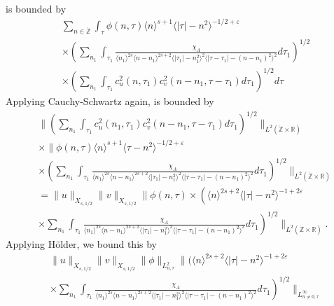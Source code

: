 \documentclass[12pt,reqno]{amsart}
\numberwithin{equation}{section}  %
\renewcommand{\cref}{\Cref}
\newcommand{\rr}{\mathbb{R}}
\newcommand{\zz}{\mathbb{Z}}
\newcommand{\zzdot}{\dot{\zz}}
\newcommand{\ee}{\varepsilon}
\begin{document}
is bounded by 
\begin{equation}
\label{10g}
\begin{split}
& \sum_{n \in \zzdot} \int_{\tau} \phi(n, \tau) \langle n \rangle ^{s+1}
\langle | \tau | - n^{2} \rangle ^{-1/2+\ee}
\\
& \times \left( \sum_{n_{1}} \int_{\tau_{1}}
\frac{\chi_{A}}{\langle n_{1} \rangle ^{2s} \langle n-n_{1} \rangle ^{2s+2} \langle |
\tau_{1} | - n_{1}^{2}\rangle^{2}  \langle | \tau - \tau_{1} | -
(n - n_{1})^{2} \rangle^{2}} d \tau_{1} \right)^{1/2}
\\
& \times \left( \sum_{n_{1}} \int_{\tau_{1}} c_{u}^{2}(n, \tau_{1})
c_{v}^{2}(n - n_{1}, \tau - \tau_{1}) d \tau_{1} \right)^{1/2} d \tau
\end{split}
\end{equation}
Applying Cauchy-Schwartz again, \cref{10g} is bounded by
\begin{equation*}
\begin{split}
& \|\left( \sum_{n_{1}}\int_{\tau_{1}} c_{u}^{2}(n_1, \tau_1)
c_{v}^{2} (n - n_1, \tau - \tau_{1} ) d \tau_1  \right)^{1/2} \|_{L^{2}(\zzdot \times
\rr)}
\\
& \times  \|\phi(n, \tau)  \langle n
\rangle ^{s+1} \langle \tau - n^{2} \rangle ^{-1/2+\ee}
\\
& \times \left( \sum_{n_{1}} \int_{\tau_{1}} \frac{\chi_{A}}{\langle n_{1}
\rangle ^{2s} \langle n-n_{1} \rangle ^{2s+2} \langle | \tau_{1}|-n_{1}^{2}
\rangle^{2} \langle  |\tau -
\tau_{1} | -(n - n_{1})^{2}
\rangle^{2}} d \tau_1 \right)^{1/2} \|_{L^2(\zzdot \times \rr)}
\\
& = \|u\|_{X_{s,1/2}} \|v\|_{X_{s,1/2}} \label{holder-term}
\|\phi(n, \tau) \times \left(  \langle n
\rangle ^{2s+2} \langle |\tau| - n^{2} \rangle^{-1 + 2\ee}  \right .
\\
& \times \left . \sum_{n_{1}} \int_{\tau_{1}} \frac{\chi_{A}}{\langle n_{1} \rangle ^{2s} \langle
n-n_{1} \rangle ^{2s+2}  \langle | \tau_{1}|-n_{1}^{2} \rangle^{2} \langle  |\tau -
\tau_{1} | -(n - n_{1})^{2}
\rangle^{2}} d \tau_1 \right)^{1/2} \|_{L^2(\zzdot \times \rr)}.
\end{split}
\end{equation*}
Applying H{\"o}lder, we bound this by 
\begin{equation}
\label{integral-bound-1st-form-per}
\begin{split}
& \|u\|_{X_{s,1/2}} \|v\|_{X_{s,1/2}} \| \phi \|_{L^{2}_{n, \tau}}
\|\bigg (  \langle n
\rangle ^{2s+2} \langle | \tau | - n^{2} \rangle ^{-1 + 2\ee}
\\
& \times \left. 
\sum_{n_{1}} \int_{\tau_{1}} \frac{\chi_{A}}{\langle n_{1} \rangle ^{2s} \langle
n-n_{1} \rangle ^{2s+2} \langle | \tau_{1}|-n_{1}^{2} \rangle^{2} \langle  |\tau -
\tau_{1} | -(n - n_{1})^{2}
\rangle^{2}} d \tau_1 \right)^{1/2} \|_{L^\infty_{n \neq 0, \tau}}
\end{split}
\end{equation}
\end{document}
